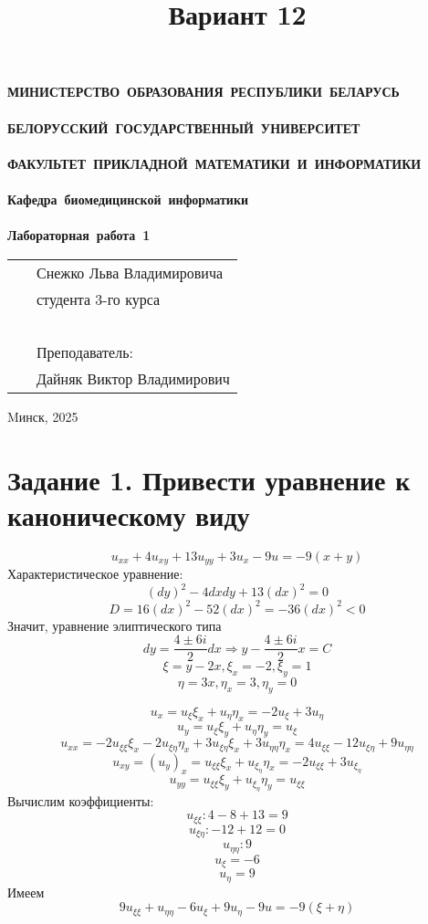 \documentclass[a4paper,12pt]{article}
\begin{document}
\setcounter{page}{1}
\thispagestyle{empty}
\begin{center}
\bf
\vspace{4cm}
{
\mbox{МИНИСТЕРСТВО~ОБРАЗОВАНИЯ~РЕСПУБЛИКИ~БЕЛАРУСЬ} \\~\\
\mbox{БЕЛОРУССКИЙ~ГОСУДАРСТВЕННЫЙ~УНИВЕРСИТЕТ} \\~\\
\mbox{ФАКУЛЬТЕТ ПРИКЛАДНОЙ МАТЕМАТИКИ И ИНФОРМАТИКИ} \\~\\
\mbox{Кафедра~биомедицинской~информатики} \\~\\
}
\vspace{4cm}
\bf
\mbox{Лабораторная работа 1}\\
\vspace{1cm}
\vspace{3cm}
\end{center}
\begin{tabular}{ll}
\hspace{10.5cm}
&Снежко Льва Владимировича~\\
&студента 3-го курса\\~\\
&Преподаватель:\\
&Дайняк Виктор Владимирович
\end{tabular}
\vspace{7cm}
\begin{center}
Mинск, 2025
\end{center}
\clearpage
\restoregeometry
\title{Вариант 12}
\date{}
\maketitle
\section{Задание 1. Привести уравнение к каноническому виду}
$$u_{xx} + 4u_{xy} + 13u_{yy} + 3u_x - 9u = -9(x+y)$$
Характеристическое уравнение:
$$(dy)^2 - 4dxdy + 13(dx)^2 = 0$$
$$D = 16(dx)^2 - 52(dx)^2 = -36(dx)^2 < 0$$
Значит, уравнение элиптического типа
$$dy = \frac{4 \pm 6i}{2}dx \Rightarrow y - \frac{4 \pm 6i}{2}x = C$$
$$\xi = y - 2x, \xi_x = -2, \xi_y = 1$$
$$\eta = 3x, \eta_x = 3, \eta_y = 0$$

$$u_x = u_{\xi}\xi_x + u_{\eta}\eta_x = -2u_{\xi} + 3u_{\eta}$$
$$u_y = u_{\xi}\xi_y + u_{\eta}\eta_y = u_{\xi}$$
$$u_{xx} = -2u_{\xi\xi}\xi_x - 2u_{\xi\eta}\eta_x + 3u_{\xi\eta}\xi_x + 3u_{\eta\eta}\eta_x 
= 4u_{\xi\xi} - 12u_{\xi\eta}+9u_{\eta\eta}$$
$$u_{xy} = (u_y)_x = u_{\xi\xi}\xi_x + u_{\xi_\eta}\eta_x
= -2u_{\xi\xi} + 3u_{\xi_\eta}$$
$$u_{yy} = u_{\xi\xi}\xi_y + u_{\xi_\eta}\eta_y 
= u_{\xi\xi}$$
Вычислим коэффициенты:
$$u_{\xi\xi}: 4 - 8 + 13 = 9$$
$$u_{\xi\eta}: -12 + 12 = 0$$
$$u_{\eta\eta}: 9$$
$$u_{\xi} = -6$$
$$u_{\eta} = 9$$
Имеем
$$9u_{\xi\xi} + u_{\eta\eta} - 6u_{\xi} +9u_{\eta} - 9u = -9(\xi+\eta)$$
$$$$
\end{document}
